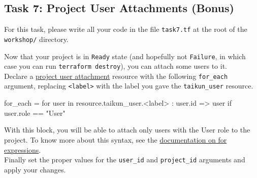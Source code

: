 \subsection{Task 7: Project User Attachments (Bonus)}\label{sec:task7}

\begin{note}
For this task, please write all your code in the file \texttt{task7.tf}
at the root of the \texttt{workshop/} directory.
\end{note}

Now that your project is in \texttt{Ready} state (and hopefully not \texttt{Failure},
in which case you can run \texttt{terraform destroy}), you can attach some users to it.\\

Declare a \href{https://intuinewin.github.io/taikun-docs/resources/project_user_attachment.html}{project user attachment}
resource with the following \texttt{for\_each} argument, replacing \texttt{<label>} with the label you gave
the \texttt{taikun\_user} resource.
\begin{tf}
  for_each = {
    for user in resource.taikun_user.<label> : user.id => user
    if user.role == "User"
  }
\end{tf}
With this block, you will be able to attach only users with the User role to the project.
To know more about this syntax, see the
\href{https://www.terraform.io/docs/language/expressions/for.html}{documentation on for expressions}.\\

Finally set the proper values for the \texttt{user\_id} and \texttt{project\_id} arguments
and apply your changes.
